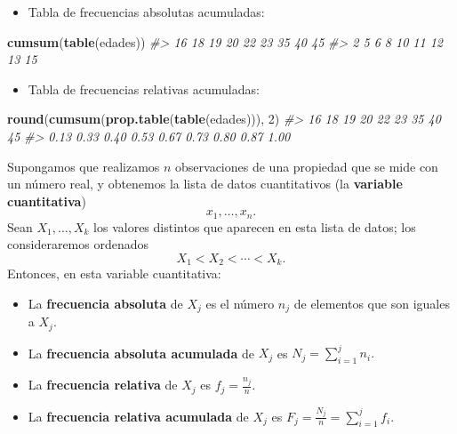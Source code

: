 \documentclass[
]{book}
\newenvironment{Shaded}{\begin{snugshade}}{\end{snugshade}}
\newcommand{\CommentTok}[1]{\textcolor[rgb]{0.56,0.35,0.01}{\textit{#1}}}
\newcommand{\DecValTok}[1]{\textcolor[rgb]{0.00,0.00,0.81}{#1}}
\newcommand{\KeywordTok}[1]{\textcolor[rgb]{0.13,0.29,0.53}{\textbf{#1}}}
\newcommand{\NormalTok}[1]{#1}
\providecommand{\tightlist}{%
  \setlength{\itemsep}{0pt}\setlength{\parskip}{0pt}}
\theoremstyle{definition}
\theoremstyle{definition}
\theoremstyle{definition}
\theoremstyle{remark}
\begin{document}
\begin{itemize}
\tightlist
\item
  Tabla de frecuencias absolutas acumuladas:
\end{itemize}

\begin{Shaded}
\begin{Highlighting}[]
\KeywordTok{cumsum}\NormalTok{(}\KeywordTok{table}\NormalTok{(edades))}
\CommentTok{\#\textgreater{} 16 18 19 20 22 23 35 40 45 }
\CommentTok{\#\textgreater{}  2  5  6  8 10 11 12 13 15}
\end{Highlighting}
\end{Shaded}

\begin{itemize}
\tightlist
\item
  Tabla de frecuencias relativas acumuladas:
\end{itemize}

\begin{Shaded}
\begin{Highlighting}[]
\KeywordTok{round}\NormalTok{(}\KeywordTok{cumsum}\NormalTok{(}\KeywordTok{prop.table}\NormalTok{(}\KeywordTok{table}\NormalTok{(edades))), }\DecValTok{2}\NormalTok{)}
\CommentTok{\#\textgreater{}   16   18   19   20   22   23   35   40   45 }
\CommentTok{\#\textgreater{} 0.13 0.33 0.40 0.53 0.67 0.73 0.80 0.87 1.00}
\end{Highlighting}
\end{Shaded}

Supongamos que realizamos \(n\) observaciones de una propiedad que se mide con un número real, y obtenemos la lista de datos cuantitativos (la \textbf{variable cuantitativa})
\[
x_1, \ldots, x_n.
\]
Sean \(X_1, \ldots, X_k\) los valores distintos que aparecen en esta lista de datos; los consideraremos ordenados
\[
X_1 < X_2 < \cdots < X_k.
\]
Entonces, en esta variable cuantitativa:

\begin{itemize}
\item
  La \textbf{frecuencia absoluta} de \(X_j\) es el número \(n_j\) de elementos que son iguales a \(X_j\).
\item
  La \textbf{frecuencia absoluta acumulada} de \(X_j\) es \(\displaystyle N_j=\sum\limits_{i=1}^j n_i.\)
\item
  La \textbf{frecuencia relativa} de \(X_j\) es \(\displaystyle f_j=\frac{n_j}{n}.\)
\item
  La \textbf{frecuencia relativa acumulada} de \(X_j\) es
  \(\displaystyle F_j=\frac{N_j}{n}=\sum\limits_{i=1}^j f_i.\)
\end{itemize}
\end{document}
